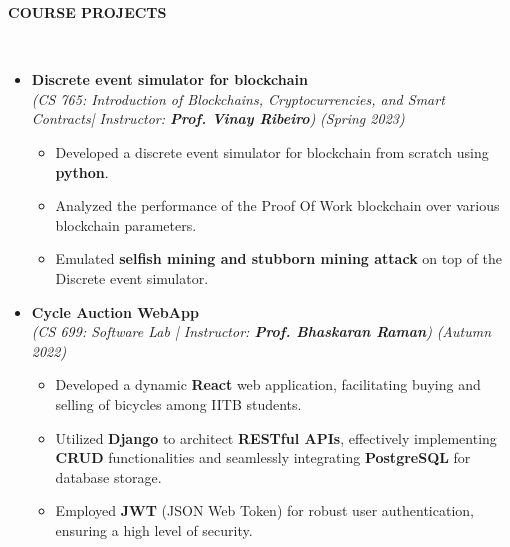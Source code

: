 \documentclass[a4paper,10pt]{article}
\newcommand{\resheading}[1]{{\small \colorbox{mygrey}{\begin{minipage}{0.99\textwidth}{\textbf{#1 \vphantom{p\^{E}}}}\end{minipage}}}}
\begin{document}
\resheading{\textbf{COURSE PROJECTS} }\\
\begin{itemize}[noitemsep,nolistsep]
\setlength\itemsep{0.3cm}
\item \textbf{Discrete event simulator for blockchain}\\
\emph{(CS 765: Introduction of Blockchains, Cryptocurrencies, and Smart Contracts| Instructor: \textbf{Prof. Vinay Ribeiro})} \hfill\emph{(Spring 2023)}\\[-0.5cm]
	\begin{itemize}[noitemsep]
	\item Developed a discrete event simulator for blockchain from scratch using \textbf{python}.
    \item Analyzed the performance of the Proof Of Work blockchain over various blockchain parameters.
    \item Emulated \textbf{selfish mining and stubborn mining attack} on top of the Discrete event simulator.

	\end{itemize}


\item \textbf{Cycle Auction WebApp}\\
\emph{(CS 699: Software Lab | Instructor: \textbf{Prof. Bhaskaran Raman})} \hfill\emph{(Autumn 2022)}\\[-0.5cm]
	\begin{itemize}[noitemsep]
    \item Developed a dynamic \textbf{React} web application, facilitating buying and selling of bicycles among IITB students.
	\item Utilized \textbf{Django} to architect \textbf{RESTful APIs}, effectively implementing \textbf{CRUD} functionalities and seamlessly integrating \textbf{PostgreSQL} for database storage.
    \item Employed \textbf{JWT} (JSON Web Token) for robust user authentication, ensuring a high level of security.
	\end{itemize}


\end{itemize}
\end{document}

